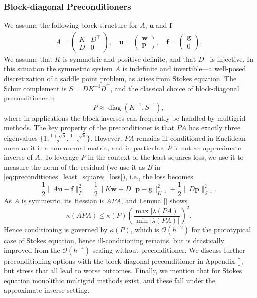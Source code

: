 \documentclass{article} %
\begin{document}
\subsubsection{Block-diagonal Preconditioners}\label{sec:block_diagonal_preconditioner} We assume the following block structure for $A$, $\mathbf u$ and $\mathbf f$
\begin{align*}
   A = 
   \begin{pmatrix}
      K & D^\top \\ 
      D & 0   
   \end{pmatrix},
   \quad
   \mathbf u = 
   \begin{pmatrix}
      \mathbf w \\
      \mathbf p
   \end{pmatrix},
   \quad
   \mathbf f =
   \begin{pmatrix}
      \mathbf g \\
      0
   \end{pmatrix}.
\end{align*}
We assume that $K$ is symmetric and positive definite, and that $D^\top$ is injective. In this situation the symmetric system $A$ is indefinite and invertible---a well-posed discretization of a saddle point problem, as arises from Stokes equation. The Schur complement is $S=DK^{-1}D^\top$, and the classical choice of block-diagonal preconditioner is
\begin{equation*}
   P \approx \operatorname{diag}(K^{-1}, S^{-1}),
\end{equation*}
where in applications the block inverses can frequently be handled by multigrid methods. The key property of the preconditioner is that $PA$ has exactly three eigenvalues $\{ 1, \frac{1+\sqrt 5}{2}, \frac{1-\sqrt 5}{2} \}$. However, $PA$ remains ill-conditioned in Euclidean norm as it is a non-normal matrix, and in particular, $P$ is not an approximate inverse of $A$. To leverage $P$ in the context of the least-squares loss, we use it to measure the norm of the residual (we use it as $B$ in \eqref{eq:preconditiones_least_squares_loss}), i.e., the loss becomes
\begin{equation*}
   \frac{1}{2} \| A\mathbf u - \mathbf f \|^2_P 
   =
   \frac12 \| K\mathbf w + D^\top \mathbf p - \mathbf g \|^2_{K^{-1}} + \frac12 \| D\mathbf p \|^2_{S^{-1}}.
\end{equation*}
As $A$ is symmetric, its Hessian is $APA$, and Lemma [] shows 
\begin{equation*}
   \kappa(APA) \leq \kappa(P)\left(\frac{\max|\lambda(PA)|}{\min|\lambda(PA)|}\right)^2.
\end{equation*}
Hence conditioning is governed by $\kappa(P)$, which is $\mathcal O(h^{-2})$ for the prototypical case of Stokes equation, hence ill-conditioning remains, but is drastically improved from the $\mathcal O(h^{-4})$ scaling without preconditioner. We discuss further preconditioning options with the block-diagonal preconditioner in Appendix [], but stress that all lead to worse outcomes. Finally, we mention that for Stokes equation monolithic multigrid methods exist, and these fall under the approximate inverse setting.
\end{document}
